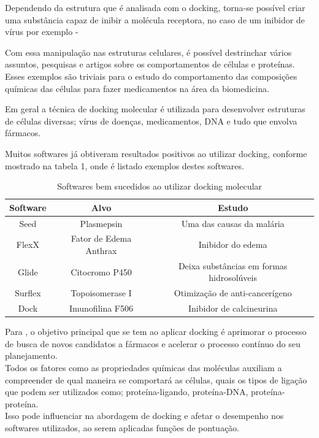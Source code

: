 \documentclass[tcc, capa]{texucpel}
\begin{document}
Dependendo da estrutura que é analisada com o docking, torna-se possível criar uma substância capaz de inibir a molécula receptora, no caso de um inibidor de vírus por exemplo - \cite{ishikawa2011binding}

Com essa manipulação nas estruturas celulares, é possível destrinchar vários assuntos, pesquisas e artigos sobre os comportamentos de células e proteínas.
Esses exemplos são triviais para o estudo do comportamento das composições químicas das células para fazer medicamentos na área da biomedicina. 

Em geral a técnica de docking molecular é utilizada para desenvolver estruturas de células diversas; vírus de doenças, medicamentos, DNA e tudo que envolva fármacos. 

Muitos softwares já obtiveram resultados positivos ao utilizar docking, conforme mostrado na tabela 1, onde é listado exemplos destes softwares.
\begin{table}[h]
\centering
\begin{tabular}{@{}|c|c|c|@{}}
\toprule

Software & Alvo                   & Estudo                                                   \\ \midrule
Seed     & Plasmepsin             & Uma das causas da malária                                \\ \midrule
FlexX    & Fator de Edema Anthrax & Inibidor do edema                                        \\ \midrule
Glide    & Citocromo P450         & Deixa substâncias em formas hidrosolúveis         \\ \midrule
Surflex  & Topoisomerase I        & Otimização de anti-cancerígeno                           \\ \midrule
Dock     & Imunofilina F506       & Inibidor de calcineurina \\ \bottomrule
\end{tabular}
\caption{Softwares bem sucedidos ao utilizar docking molecular \cite{sliwoski2014computational} }
\end{table}

Para \cite{rodrigues2012estrategias}, o objetivo principal que se tem ao aplicar docking é aprimorar o processo de busca de novos candidatos a fármacos e acelerar o processo contínuo do seu planejamento. \\
Todos os fatores como as propriedades químicas das moléculas auxiliam a compreender de qual maneira se comportará as células, quais os tipos de ligação que podem ser utilizados como; proteína-ligando, proteína-DNA, proteína-proteína. \\Isso pode influenciar na abordagem de docking e afetar o desempenho nos softwares utilizados, ao serem aplicadas funções de pontuação.
\end{document}
